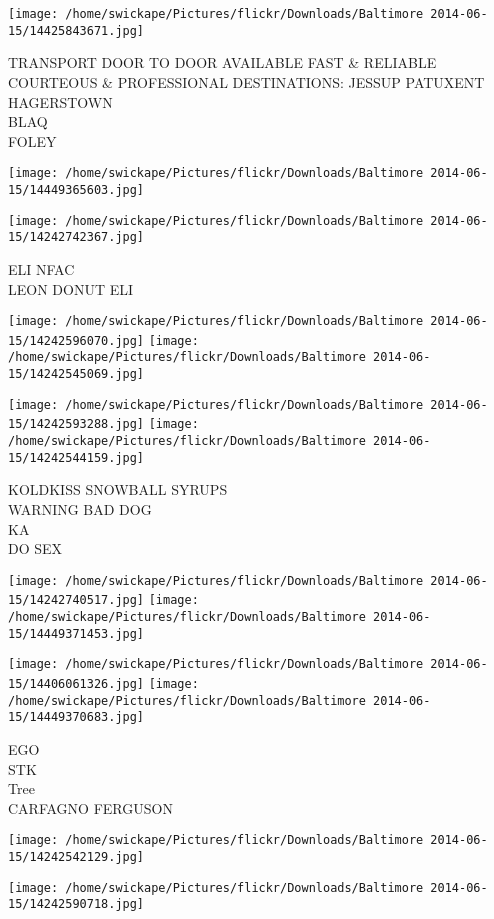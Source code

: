 \documentclass[10pt,letterpaper]{article}
\begin{document}
\texttt{[image: /home/swickape/Pictures/flickr/Downloads/Baltimore 2014-06-15/14425843671.jpg]}

TRANSPORT DOOR TO DOOR AVAILABLE FAST \& RELIABLE COURTEOUS \& PROFESSIONAL DESTINATIONS: JESSUP PATUXENT HAGERSTOWN\\
BLAQ\\
FOLEY
\pagebreak

\texttt{[image: /home/swickape/Pictures/flickr/Downloads/Baltimore 2014-06-15/14449365603.jpg]}

\vspace{0.25in}
\texttt{[image: /home/swickape/Pictures/flickr/Downloads/Baltimore 2014-06-15/14242742367.jpg]}

ELI NFAC\\
LEON DONUT ELI
\pagebreak

\texttt{[image: /home/swickape/Pictures/flickr/Downloads/Baltimore 2014-06-15/14242596070.jpg]}
\texttt{[image: /home/swickape/Pictures/flickr/Downloads/Baltimore 2014-06-15/14242545069.jpg]}

\texttt{[image: /home/swickape/Pictures/flickr/Downloads/Baltimore 2014-06-15/14242593288.jpg]}
\texttt{[image: /home/swickape/Pictures/flickr/Downloads/Baltimore 2014-06-15/14242544159.jpg]}

KOLDKISS SNOWBALL SYRUPS\\
WARNING BAD DOG\\
KA\\
DO SEX
\pagebreak

\texttt{[image: /home/swickape/Pictures/flickr/Downloads/Baltimore 2014-06-15/14242740517.jpg]}
\texttt{[image: /home/swickape/Pictures/flickr/Downloads/Baltimore 2014-06-15/14449371453.jpg]}

\texttt{[image: /home/swickape/Pictures/flickr/Downloads/Baltimore 2014-06-15/14406061326.jpg]}
\texttt{[image: /home/swickape/Pictures/flickr/Downloads/Baltimore 2014-06-15/14449370683.jpg]}

EGO\\
STK\\
Tree\\
CARFAGNO FERGUSON
\pagebreak

\texttt{[image: /home/swickape/Pictures/flickr/Downloads/Baltimore 2014-06-15/14242542129.jpg]}

\vspace{0.25in}
\texttt{[image: /home/swickape/Pictures/flickr/Downloads/Baltimore 2014-06-15/14242590718.jpg]}
\end{document}
